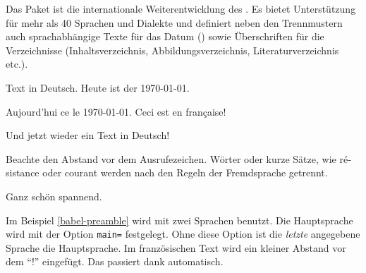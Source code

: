 Das Paket  ist die internationale Weiterentwicklung des .
Es bietet Unterstützung für mehr als 40 Sprachen und Dialekte und definiert neben den Trennmustern 
auch sprachabhängige Texte für das Datum () sowie Überschriften für die Verzeichnisse 
(Inhaltsverzeichnis, Abbildungsverzeichnis, Literaturverzeichnis etc.).


\begin{lfgwprint}{}
 Text in Deutsch.
 Heute ist der \today.
 
 \begin{otherlanguage}{french}
 Aujourd'hui ce le \today.
 Ceci est en française!
 \end{otherlanguage}
 
 Und jetzt wieder ein Text in Deutsch!
 
 Beachte den Abstand vor dem Ausrufezeichen.
 Wörter oder kurze Sätze, 
 wie \foreignlanguage{french}{résistance} oder \foreignlanguage{french}{courant}
 werden nach den Regeln der Fremdsprache getrennt.
 
 Ganz schön spannend.
\end{lfgwprint}

Im Beispiel \ref{babel-preamble} wird  mit zwei Sprachen benutzt.
Die Hauptsprache wird mit der Option \texttt{main=} festgelegt.
Ohne diese Option ist die \emph{letzte} angegebene Sprache die Hauptsprache.
Im französischen Text wird ein kleiner Abstand vor dem \enquote{!} eingefügt.
Das passiert dank  automatisch.

